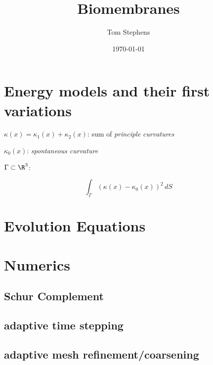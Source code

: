 \documentclass[10pt]{article}
\title{Biomembranes}
\author{Tom Stephens}
\date{ \today}
\begin{document}
\maketitle


\section{Energy models and their first variations}

$\kappa(x) = \kappa_1(x) + \kappa_2(x)$: sum of \emph{principle curvatures}

$\kappa_0(x)$: \emph{spontaneous curvature}

$\Gamma \subset \R^3$: 


\begin{equation}
   \int_{\Gamma} (\kappa(x) - \kappa_{0}(x))^2 \, dS
   \label{eqn:helfrich_energy_no_constraints}
\end{equation}

\cite{DoganNochetto:2012}

\section{Evolution Equations}

\section{Numerics}

\subsection{Schur Complement}

\subsection{adaptive time stepping}

\subsection{adaptive mesh refinement/coarsening}







\end{document}
